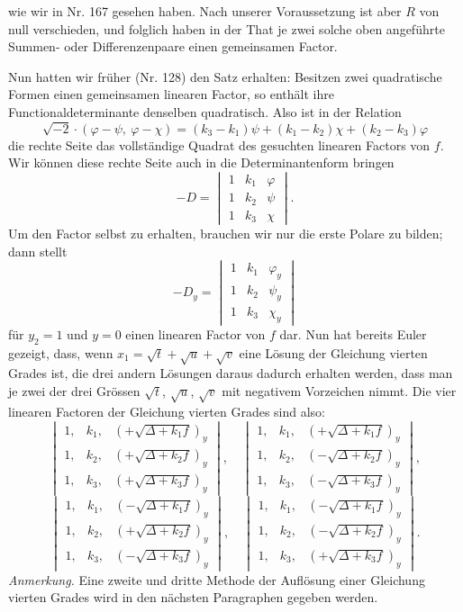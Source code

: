 wie wir in Nr. 167 gesehen haben. Nach unserer Voraussetzung ist aber $R$ von null verschieden, und folglich haben in der That je zwei solche oben angeführte Summen- oder Differenzenpaare einen gemeinsamen Factor.

Nun hatten wir früher (Nr. 128) den Satz erhalten: Besitzen zwei quadratische Formen einen gemeinsamen linearen Factor, so enthält ihre Functionaldeterminante denselben quadratisch. Also ist in der Relation
\[
\sqrt{-2}\cdot(\varphi-\psi,\ \varphi-\chi) = (k_3-k_1)\psi+(k_1-k_2)\chi+(k_2-k_3)\varphi
\]
die rechte Seite das vollständige Quadrat des gesuchten linearen Factors von $f$. Wir können diese rechte Seite auch in die Determinantenform bringen
\[
-D = \begin{vmatrix} 1 & k_1 & \varphi \\ 1 & k_2 & \psi \\ 1 & k_3 & \chi \end{vmatrix}.
\]
Um den Factor selbst zu erhalten, brauchen wir nur die erste Polare zu bilden; dann stellt
\[
-D_y = \begin{vmatrix} 1 & k_1 & \varphi_y \\ 1 & k_2 & \psi_y \\ 1 & k_3 & \chi_y \end{vmatrix}
\]
für $y_2=1$ und $y=0$ einen linearen Factor von $f$ dar. Nun hat bereits Euler gezeigt, dass, wenn $x_1=\sqrt{t}+\sqrt{u}+\sqrt{v}$ eine Lösung der Gleichung vierten Grades ist, die drei andern Lösungen daraus dadurch erhalten werden, dass man je zwei der drei Grössen $\sqrt{t}$, $\sqrt{u}$, $\sqrt{v}$ mit negativem Vorzeichen nimmt. Die vier linearen Factoren der Gleichung vierten Grades sind also:
\[
\begin{vmatrix} 1, & k_1, & (+\sqrt{\Delta+k_1f})_y \\ 1, & k_2, & (+\sqrt{\Delta+k_2f})_y \\ 1, & k_3, & (+\sqrt{\Delta+k_3f})_y \end{vmatrix},
\quad
\begin{vmatrix} 1, & k_1, & (+\sqrt{\Delta+k_1f})_y \\ 1, & k_2, & (-\sqrt{\Delta+k_2f})_y \\ 1, & k_3, & (-\sqrt{\Delta+k_3f})_y \end{vmatrix},
\]
\[
\begin{vmatrix} 1, & k_1, & (-\sqrt{\Delta+k_1f})_y \\ 1, & k_2, & (+\sqrt{\Delta+k_2f})_y \\ 1, & k_3, & (-\sqrt{\Delta+k_3f})_y \end{vmatrix},
\quad
\begin{vmatrix} 1, & k_1, & (-\sqrt{\Delta+k_1f})_y \\ 1, & k_2, & (-\sqrt{\Delta+k_2f})_y \\ 1, & k_3, & (+\sqrt{\Delta+k_3f})_y \end{vmatrix}.
\]
\textit{Anmerkung.} Eine zweite und dritte Methode der Auflösung einer Gleichung vierten Grades wird in den nächsten Paragraphen gegeben werden.

